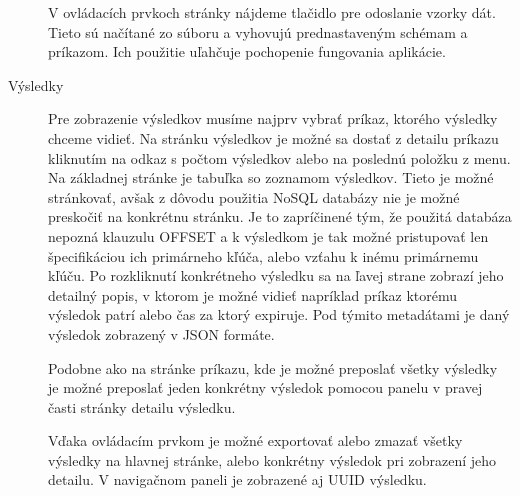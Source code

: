 \begin{description}
		V ovládacích prvkoch stránky nájdeme tlačidlo pre odoslanie vzorky dát. Tieto sú načítané zo súboru a vyhovujú prednastaveným schémam a príkazom. Ich použitie uľahčuje pochopenie fungovania aplikácie.
		
		\item[Výsledky] Pre zobrazenie výsledkov musíme najprv vybrať príkaz, ktorého výsledky chceme vidieť. Na stránku výsledkov je možné sa dostať z detailu príkazu kliknutím na odkaz s počtom výsledkov alebo na poslednú položku z menu.
		Na základnej stránke je tabuľka so zoznamom výsledkov. Tieto je možné stránkovať, avšak z dôvodu použitia NoSQL databázy nie je možné preskočiť na konkrétnu stránku. Je to zapríčinené tým, že použitá databáza nepozná klauzulu OFFSET a k výsledkom je tak možné pristupovať len špecifikáciou ich primárneho kľúča, alebo vzťahu k inému primárnemu kľúču.
		Po rozkliknutí konkrétneho výsledku sa na ľavej strane zobrazí jeho detailný popis, v ktorom je možné vidieť napríklad príkaz ktorému výsledok patrí alebo čas za ktorý expiruje. Pod týmito metadátami je daný výsledok zobrazený v JSON formáte.
		
		Podobne ako na stránke príkazu, kde je možné preposlať všetky výsledky je možné preposlať jeden konkrétny výsledok pomocou panelu v pravej časti stránky detailu výsledku.

		Vďaka ovládacím prvkom je možné exportovať alebo zmazať všetky výsledky na hlavnej stránke, alebo konkrétny výsledok pri zobrazení jeho detailu. V navigačnom paneli je zobrazené aj UUID výsledku.
	\end{description}
	
	
	